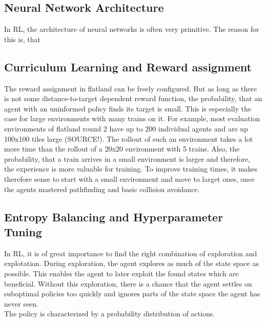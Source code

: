 \subsection*{Neural Network Architecture}\label{network_architecture}
In RL, the architecture of neural networks is often very primitive. The reason for this is, that 


\subsection*{Curriculum Learning and Reward assignment}\label{curriculum_learning}
The reward assignment in flatland can be freely configured. But as long as there is not some distance-to-target dependent reward function, the probability, that an agent with an uninformed policy finds its target is small. This is especially the case for large environments with many trains on it. For example, most evaluation environments of flatland round 2 have up to 200 individual agents and are up 100x100 tiles large (SOURCE!). The rollout of such an environment takes a lot more time than the rollout of a 20x20 environment with 5 trains. Also, the probability, that a train arrives in a small environment is larger and therefore, the experience is more valuable for training.
To improve training times, it makes therefore sense to start with a small environment and move to larget ones, once the agents mastered pathfinding and basic collision avoidance.

\subsection*{Entropy Balancing and Hyperparameter Tuning}\label{entropy_balancing_hyperparameter}
In RL, it is of great importance to find the right combination of exploration and explotation. During exploration, the agent explores as much of the state space as possible. This enables the agent to later exploit the found states which are beneficial. Without this exploration, there is a chance that the agent settles on suboptimal policies too quickly and ignores parts of the state space the agent has never seen.\\
The policy is characterized by a probability distribution of actions.

